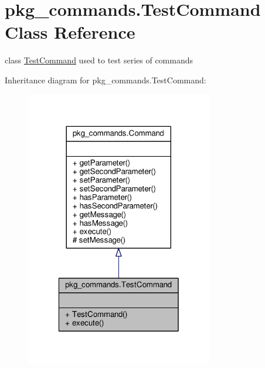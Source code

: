 \hypertarget{classpkg__commands_1_1TestCommand}{\section{pkg\-\_\-commands.\-Test\-Command Class Reference}
\label{classpkg__commands_1_1TestCommand}
}


class \hyperlink{classpkg__commands_1_1TestCommand}{Test\-Command} used to test series of commands  




Inheritance diagram for pkg\-\_\-commands.\-Test\-Command\-:\nopagebreak
\begin{figure}[H]
\begin{center}
\leavevmode
\includegraphics[width=232pt]{classpkg__commands_1_1TestCommand__inherit__graph}
\end{center}
\end{figure}


